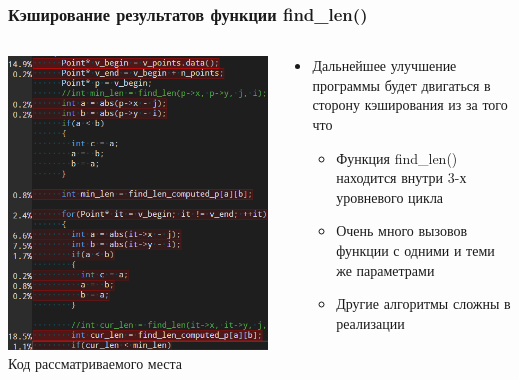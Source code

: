\documentclass[10pt]{beamer}
\begin{document}
\begin{frame}
\frametitle{Кэширование результатов функции find\_len()}


\begin{columns}[c]

\begin{center}
  \includegraphics[width=\textwidth]{res/img/AnalysisTargetWizard3CodeCropped.png}
  Код рассматриваемого места
\end{center}

\begin{block}{}
  \begin{itemize}
    \item Дальнейшее улучшение программы будет двигаться в сторону кэширования из за того что
    \begin{itemize}
      \item Функция find\_len() находится внутри 3-х уровневого цикла
      \item Очень много вызовов функции с одними и теми же параметрами
      \item Другие алгоритмы сложны в реализации
  \end{itemize}
  \end{itemize}
\end{block}

\end{columns}

\end{frame}
\end{document}
